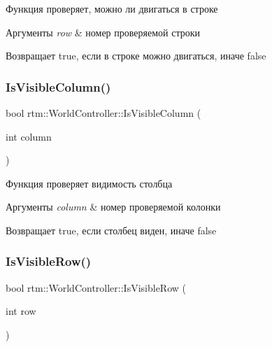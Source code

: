 Функция проверяет, можно ли двигаться в строке 
\begin{DoxyParams}{Аргументы}
{\em row} & номер проверяемой строки \\
\hline
\end{DoxyParams}
\begin{DoxyReturn}{Возвращает}
true, если в строке можно двигаться, иначе false 
\end{DoxyReturn}
\mbox{\label{classrtm_1_1_world_controller_aba0f7dc41fd8b38af0864b05e3c59761}} 
\subsubsection{\texorpdfstring{Is\+Visible\+Column()}{IsVisibleColumn()}}
{\footnotesize\ttfamily bool rtm\+::\+World\+Controller\+::\+Is\+Visible\+Column (\begin{DoxyParamCaption}\item[{int}]{column }\end{DoxyParamCaption})}

Функция проверяет видимость столбца 
\begin{DoxyParams}{Аргументы}
{\em column} & номер проверяемой колонки \\
\hline
\end{DoxyParams}
\begin{DoxyReturn}{Возвращает}
true, если столбец виден, иначе false 
\end{DoxyReturn}
\mbox{\label{classrtm_1_1_world_controller_a146a82552c4043987b96615547f527be}} 
\subsubsection{\texorpdfstring{Is\+Visible\+Row()}{IsVisibleRow()}}
{\footnotesize\ttfamily bool rtm\+::\+World\+Controller\+::\+Is\+Visible\+Row (\begin{DoxyParamCaption}\item[{int}]{row }\end{DoxyParamCaption})}

